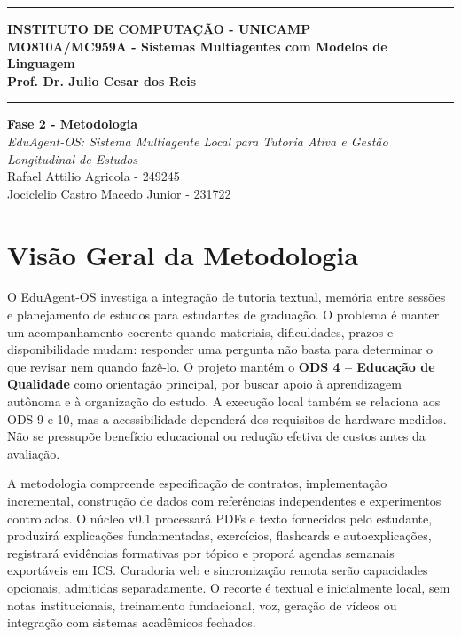 \documentclass[12pt]{article}
\renewcommand{\headrulewidth}{0pt}
\begin{document}
\vspace*{5mm}
\hrule
\vspace{3mm}
\begin{center}
    {\large\textbf{INSTITUTO DE COMPUTAÇÃO - UNICAMP}} \\
    \vspace{3mm}
    {\large\textbf{MO810A/MC959A - Sistemas Multiagentes com Modelos de Linguagem}} \\
    \vspace{3mm}
    {\large\textbf{Prof. Dr. Julio Cesar dos Reis}}
\end{center}
\vspace{3mm}
\hrule
\vspace{2.5cm}
\begin{flushright}
    {\Large\textbf{Fase 2 - Metodologia}} \\
    \vspace{1cm}
    {\Large\textit{EduAgent-OS: Sistema Multiagente Local para Tutoria Ativa e Gestão Longitudinal de Estudos}} \\
    \vspace{5cm}
    Rafael Attilio Agricola - 249245 \\
    Jociclelio Castro Macedo Junior - 231722
\end{flushright}

\newpage
\pagestyle{fancy}
\fancyhf{}
\renewcommand{\headrulewidth}{0pt}
\fancyfoot[R]{\thepage}

\section{Visão Geral da Metodologia}
\label{sec:visao_geral}

O EduAgent-OS investiga a integração de tutoria textual, memória entre sessões e planejamento de estudos para estudantes de graduação. O problema é manter um acompanhamento coerente quando materiais, dificuldades, prazos e disponibilidade mudam: responder uma pergunta não basta para determinar o que revisar nem quando fazê-lo. O projeto mantém o \textbf{ODS 4 -- Educação de Qualidade} como orientação principal, por buscar apoio à aprendizagem autônoma e à organização do estudo. A execução local também se relaciona aos ODS 9 e 10, mas a acessibilidade dependerá dos requisitos de hardware medidos. Não se pressupõe benefício educacional ou redução efetiva de custos antes da avaliação.

A metodologia compreende especificação de contratos, implementação incremental, construção de dados com referências independentes e experimentos controlados. O núcleo v0.1 processará PDFs e texto fornecidos pelo estudante, produzirá explicações fundamentadas, exercícios, flashcards e autoexplicações, registrará evidências formativas por tópico e proporá agendas semanais exportáveis em ICS. Curadoria web e sincronização remota serão capacidades opcionais, admitidas separadamente. O recorte é textual e inicialmente local, sem notas institucionais, treinamento fundacional, voz, geração de vídeos ou integração com sistemas acadêmicos fechados.
\end{document}
